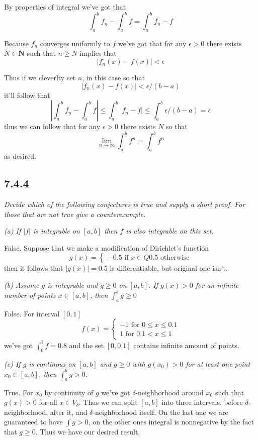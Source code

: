 \documentclass[11pt,oneside,titlepage]{book}
\begin{document}
By properties of integral we've got that
$$\int_a^b f_n - \int_a^b f = \int_a^b f_n -  f $$

Because $f_n$ converges uniformly to $f$ we've got that
for any $\epsilon > 0$ there exists $N \in \textbf{N}$ such that
$n \geq N$ implies that 
$$|f_n(x) - f(x)| < \epsilon$$

Thus if we cleverlty set $n$, in this case so that
$$|f_n(x) - f(x)| < \epsilon/(b - a)$$
it'll follow that
$$\left|\int_a^b f_n - \int_a^b f\right| \leq \int_a^b |f_n -  f|
\leq \int_a^b \epsilon/(b - a) = \epsilon$$
thus we can follow that for any $\epsilon > 0$ there exists $N$ so that 
$$\lim_{n \to \infty}{\int_a^b f^n = \int_a^b f^n}$$
as desired.

\subsection*{7.4.4}

\textit{Decide which of the following conjectures is true and supply a short
  proof. For those that are not true give a counterexample.}

\textit{(a) If $|f|$ is integrable on $[a, b]$ then $f$ is also integrable on
  this set.}

False.
Suppose that we make a modification of Dirichlet's function
$$g(x) =
\begin{cases}
  -0.5 \text{ if } x \in Q
  0.5 \text{ otherwise}
\end{cases}
$$
then it follows that $|g(x)| = 0.5$ is differentiable, but original one isn't.

\textit{(b) Assume $g$ is integrable and $g \geq 0$ on $[a, b]$. If $g(x) > 0$
  for an infinite number of points $x \in [a, b]$, then $\int_a^b g \geq 0$}

False. For interval $[0, 1]$
$$f(x) =
\begin{cases}
  -1 \text{ for } 0 \leq x \leq 0.1 \\
  1 \text{ for } 0.1 < x \leq 1
\end{cases}
$$
we've got $\int_0^1 f = 0.8$ and the set $[0, 0.1]$ contains infinite amount of
points.

\textit{(c) If $g$ is continous on $[a, b]$ and $g \geq 0$ with $g(x_0) > 0$
  for at least one point $x_0 \in [a, b]$, then $\int_a^b g > 0$.}

True. For $x_0$ by continuity of $g$ we've got $\delta$-neighborhood around
$x_0$ such that $g(x) > 0$ for all $x \in V_\delta$. Thus we can split
$[a, b]$ into three intervals: before $\delta$-neighborhood, after it,
and $\delta$-neighborhood itself. On the last one we are guaranteed to have
$\int g > 0$, on the other ones integral is nonnegative by the fact that
$g \geq 0$. Thus we have our desired result.
\end{document}
